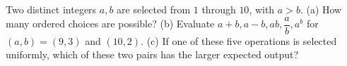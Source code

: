 Two distinct integers $a,b$ are selected from $1$ through $10$, with $a>b$. (a) How many ordered choices are possible? (b) Evaluate $a+b,a-b,ab,\dfrac{a}{b},a^b$ for $(a,b)=(9,3)$ and $(10,2)$. (c) If one of these five operations is selected uniformly, which of these two pairs has the larger expected output?
